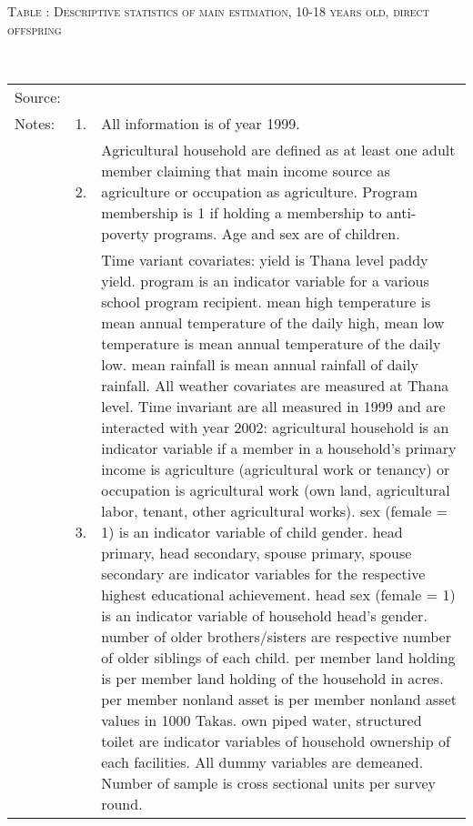 \begin{minipage}[t]{14cm}
\hfil\textsc{\normalsize Table \thetable: Descriptive statistics of main estimation, 10-18 years old, direct offspring\label{tab destat zEm1999}}\\
\setlength{\tabcolsep}{1pt}
\renewcommand{\arraystretch}{.8}
\hfil{}\\
\renewcommand{\arraystretch}{.8}
\setlength{\tabcolsep}{1pt}
\begin{tabular}{>{\hfill\scriptsize}p{1cm}<{}>{\hfill\scriptsize}p{.25cm}<{}>{\scriptsize}p{12cm}<{\hfill}}
Source:& \multicolumn{2}{l}{\scriptsize Compiled from IFPRI data.}\\
Notes: & 1. & All information is of year 1999.\\
& 2. & Agricultural household are defined as at least one adult member claiming that main income source as agriculture or occupation as agriculture. Program membership is 1 if holding a membership to anti-poverty programs. Age and sex are of children.\\
& 3. & Time variant covariates: \textsf{yield} is Thana level paddy yield. \textsf{program} is an indicator variable for a various school program recipient. \textsf{mean high temperature} is mean annual temperature of the daily high, \textsf{mean low temperature} is mean annual temperature of the daily low. \textsf{mean rainfall} is mean annual rainfall of daily rainfall. All weather covariates are measured at Thana level. Time invariant are all measured in 1999 and are interacted with year 2002: \textsf{agricultural household} is an indicator variable if a member in a household's primary income is agriculture (agricultural work or tenancy) or occupation is agricultural work (own land, agricultural labor, tenant, other agricultural works). \textsf{sex (female = 1)} is an indicator variable of child gender. \textsf{head primary, head secondary, spouse primary, spouse secondary} are indicator variables for the respective highest educational achievement. \textsf{head sex (female = 1)} is an indicator variable of household head's gender. \textsf{number of older brothers/sisters} are respective number of older siblings of each child. \textsf{per member land holding} is per member land holding of the household in acres. \textsf{per member nonland asset} is per member nonland asset values in 1000 Takas. \textsf{own piped water, structured toilet} are indicator variables of household ownership of each facilities. All dummy variables are demeaned. Number of sample is cross sectional units per survey round. 
\end{tabular}
\end{minipage}\\ \vspace{2ex}

